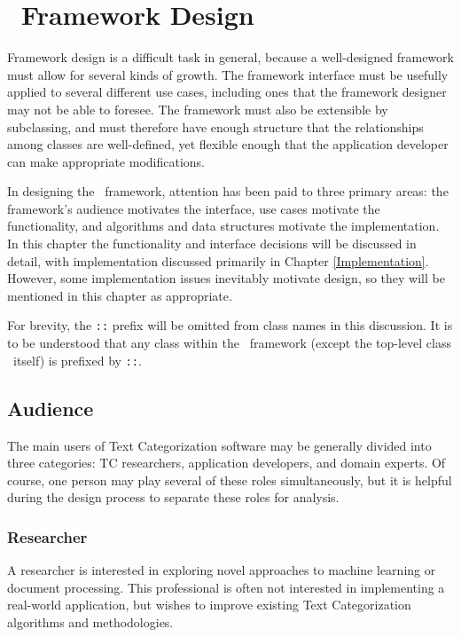 \chapter{\aicat\ Framework Design}
\label{design}

Framework design is a difficult task in general, because a
well-designed framework must allow for several kinds of
growth.\cite[p. 11]{fayad:99} The framework interface must be
usefully applied to several different use cases, including ones that
the framework designer may not be able to foresee.  The framework must
also be extensible by subclassing, and must therefore have enough
structure that the relationships among classes are well-defined, yet
flexible enough that the application developer can make appropriate
modifications.

In designing the \aicat\ framework, attention has been paid to three
primary areas: the framework's audience motivates the interface, use
cases motivate the functionality, and algorithms and data structures
motivate the implementation.  In this chapter the functionality and
interface decisions will be discussed in detail, with implementation
discussed primarily in Chapter \ref{Implementation}.  However, some
implementation issues inevitably motivate design, so they will be
mentioned in this chapter as appropriate.

For brevity, the \aicat\texttt{::} prefix will be omitted from class
names in this discussion.  It is to be understood that any class
within the \aicat\ framework (except the top-level class
\aicat\ itself) is prefixed by \aicat\texttt{::}.

\section{Audience}

The main users of Text Categorization software may be generally
divided into three categories: TC researchers, application developers,
and domain experts.  Of course, one person may play several of these
roles simultaneously, but it is helpful during the design process to
separate these roles for analysis.

\subsection{Researcher}

A researcher is interested in exploring novel approaches to machine
learning or document processing.  This professional is often not
interested in implementing a real-world application, but wishes to
improve existing Text Categorization algorithms and methodologies.

